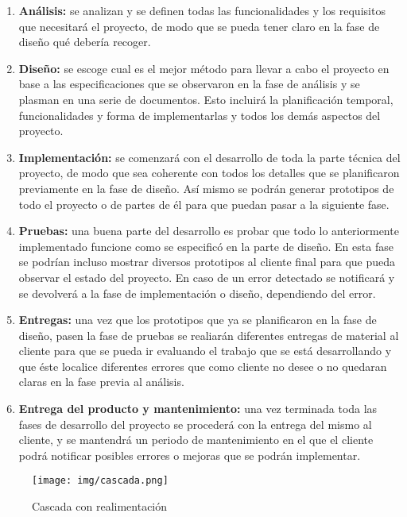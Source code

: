 \documentclass[palatino]{apuntes}
\begin{document}
\begin{itemize}
\begin{enumerate}
	\item \textbf{Análisis:} se analizan y se definen todas las funcionalidades y los requisitos que necesitará el proyecto, de modo que se pueda tener claro en la fase de diseño qué debería recoger.
	\item \textbf{Diseño:} se escoge cual es el mejor método para llevar a cabo el proyecto en base a las especificaciones que se observaron en la fase de análisis y se plasman en una serie de documentos. Esto incluirá  la planificación temporal, funcionalidades y forma de implementarlas y todos los demás aspectos del proyecto.
	\item \textbf{Implementación:} se comenzará con el desarrollo de toda la parte técnica del proyecto, de modo que sea coherente con todos los detalles que se planificaron previamente en la fase de diseño. Así mismo se podrán generar prototipos de todo el proyecto o de partes de él para que puedan pasar a la siguiente fase.
	\item \textbf{Pruebas:} una buena parte del desarrollo es probar que todo lo anteriormente implementado funcione como se especificó en la parte de diseño. En esta fase se podrían incluso mostrar diversos prototipos al cliente final para que pueda observar el estado del proyecto. En caso de un error detectado se notificará y se devolverá a la fase de implementación o diseño, dependiendo del error.
	\item \textbf{Entregas:} una vez que los prototipos que ya se planificaron en la fase de diseño, pasen la fase de pruebas se realiarán diferentes entregas de material al cliente para que se pueda ir evaluando el trabajo que se está desarrollando y que éste localice diferentes errores que como cliente no desee o no quedaran claras en la fase previa al análisis.
	\item \textbf{Entrega del producto y mantenimiento:} una vez terminada toda las fases de desarrollo del proyecto se procederá con la entrega del mismo al cliente, y se mantendrá un periodo de mantenimiento en el que el cliente podrá notificar posibles errores o mejoras que se podrán implementar.
\end{enumerate}

\begin{figure}[hbtp]
    \centering
    \texttt{[image: img/cascada.png]}
    \caption{Cascada con realimentación}
    \label{fig:cascadarealimentacion}
\end{figure}






\end{itemize}
\end{document}

